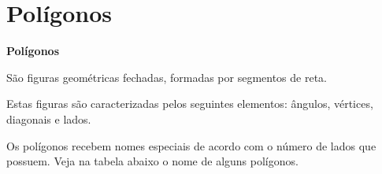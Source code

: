\section{Polígonos}

\vskip0.3cm

\colorbox{azul}{
 \begin{minipage}{0.9\linewidth}
 \begin{center}
 \textbf{Polígonos}

  São figuras geométricas fechadas, formadas por segmentos de reta.

  Estas figuras são caracterizadas pelos seguintes elementos: ângulos, vértices, diagonais e lados.
 \end{center}
 \end{minipage}}

 \vskip0.3cm

  Os polígonos recebem nomes especiais de acordo com o número de lados que possuem. Veja na tabela abaixo o nome de alguns polígonos.


